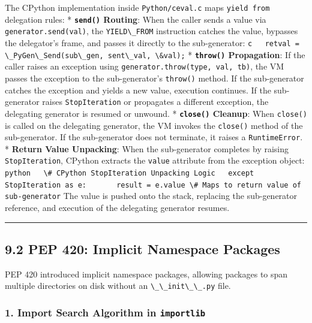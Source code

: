 The CPython implementation inside
\passthrough{\lstinline!Python/ceval.c!} maps
\passthrough{\lstinline!yield from!} delegation rules: *
\textbf{\passthrough{\lstinline!send()!} Routing}: When the caller sends
a value via \passthrough{\lstinline!generator.send(val)!}, the
\passthrough{\lstinline!YIELD\_FROM!} instruction catches the value,
bypasses the delegator's frame, and passes it directly to the
sub-generator:
\passthrough{\lstinline!c   retval = \_PyGen\_Send(sub\_gen, sent\_val, \&val);!}
* \textbf{\passthrough{\lstinline!throw()!} Propagation}: If the caller
raises an exception using
\passthrough{\lstinline!generator.throw(type, val, tb)!}, the VM passes
the exception to the sub-generator's \passthrough{\lstinline!throw()!}
method. If the sub-generator catches the exception and yields a new
value, execution continues. If the sub-generator raises
\passthrough{\lstinline!StopIteration!} or propagates a different
exception, the delegating generator is resumed or unwound. *
\textbf{\passthrough{\lstinline!close()!} Cleanup}: When
\passthrough{\lstinline!close()!} is called on the delegating generator,
the VM invokes the \passthrough{\lstinline!close()!} method of the
sub-generator. If the sub-generator does not terminate, it raises a
\passthrough{\lstinline!RuntimeError!}. * \textbf{Return Value
Unpacking}: When the sub-generator completes by raising
\passthrough{\lstinline!StopIteration!}, CPython extracts the
\passthrough{\lstinline!value!} attribute from the exception object:
\passthrough{\lstinline!python   \# CPython StopIteration Unpacking Logic   except StopIteration as e:       result = e.value \# Maps to return value of sub-generator!}
The value is pushed onto the stack, replacing the sub-generator
reference, and execution of the delegating generator resumes.

\begin{center}\rule{0.5\linewidth}{0.5pt}\end{center}

\hypertarget{pep-420-implicit-namespace-packages}{%
\subsection{9.2 PEP 420: Implicit Namespace
Packages}\label{pep-420-implicit-namespace-packages}}

PEP 420 introduced implicit namespace packages, allowing packages to
span multiple directories on disk without an
\passthrough{\lstinline!\_\_init\_\_.py!} file.

\hypertarget{import-search-algorithm-in-importlib}{%
\subsubsection{\texorpdfstring{1. Import Search Algorithm in
\texttt{importlib}}{1. Import Search Algorithm in importlib}}\label{import-search-algorithm-in-importlib}}

